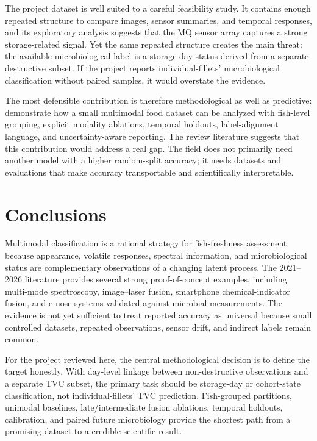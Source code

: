 \documentclass[11pt]{article}
\begin{document}
The project dataset is well suited to a careful feasibility study. It contains enough repeated structure to compare images, sensor summaries, and temporal responses, and its exploratory analysis suggests that the MQ sensor array captures a strong storage-related signal. Yet the same repeated structure creates the main threat: the available microbiological label is a storage-day status derived from a separate destructive subset. If the project reports individual-fillets' microbiological classification without paired samples, it would overstate the evidence.

The most defensible contribution is therefore methodological as well as predictive: demonstrate how a small multimodal food dataset can be analyzed with fish-level grouping, explicit modality ablations, temporal holdouts, label-alignment language, and uncertainty-aware reporting. The review literature suggests that this contribution would address a real gap. The field does not primarily need another model with a higher random-split accuracy; it needs datasets and evaluations that make accuracy transportable and scientifically interpretable.

\section{Conclusions}

Multimodal classification is a rational strategy for fish-freshness assessment because appearance, volatile responses, spectral information, and microbiological status are complementary observations of a changing latent process. The 2021--2026 literature provides several strong proof-of-concept examples, including multi-mode spectroscopy, image--laser fusion, smartphone chemical-indicator fusion, and e-nose systems validated against microbial measurements. The evidence is not yet sufficient to treat reported accuracy as universal because small controlled datasets, repeated observations, sensor drift, and indirect labels remain common.

For the project reviewed here, the central methodological decision is to define the target honestly. With day-level linkage between non-destructive observations and a separate TVC subset, the primary task should be storage-day or cohort-state classification, not individual-fillets' TVC prediction. Fish-grouped partitions, unimodal baselines, late/intermediate fusion ablations, temporal holdouts, calibration, and paired future microbiology provide the shortest path from a promising dataset to a credible scientific result.
\end{document}
